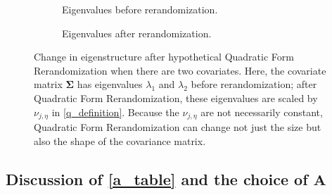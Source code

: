 \documentclass[11pt,twoside]{article}
\theoremstyle{definition}
\theoremstyle{remark}
\begin{document}
    \begin{figure}[h]
  \begin{subfigure}[b]{0.5\textwidth}
    \centering
{}
    \caption{Eigenvalues before rerandomization.}
  \end{subfigure}
  \hspace{0.005\textwidth} 
  \begin{subfigure}[b]{0.5\textwidth}
    \centering
{}
    \caption{Eigenvalues after rerandomization.}
  \end{subfigure}
  \caption{Change in eigenstructure after hypothetical Quadratic Form Rerandomization when there are two covariates. Here, the covariate matrix $\mathbf{\Sigma}$ has eigenvalues $\lambda_1$ and $\lambda_2$ before rerandomization; after Quadratic Form Rerandomization, these eigenvalues are scaled by $\nu_{j,\eta}$ in \cref{q_definition}. Because the $\nu_{j, \eta}$ are not necessarily constant, Quadratic Form Rerandomization can change not just the size but also the shape of the covariance matrix.}
  \label{diffineigen}  
\end{figure}

\subsection{Discussion of \cref{a_table} and the choice of $\mathbf{A}$}
\end{document}
